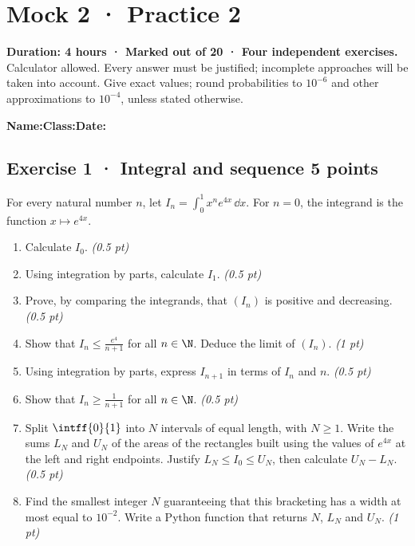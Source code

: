 \fi

\mxnewpage{}\label{sujet:8-2}

\section*{Mock 2 · Practice 2}


\textbf{Duration: 4 hours · Marked out of 20 · Four independent exercises.}\\Calculator allowed. Every answer must be justified; incomplete approaches will be taken into account. Give exact values; round probabilities to $10^{-6}$ and other approximations to $10^{-4}$, unless stated otherwise.

\smallskip\textbf{Name:}\enspace\dotfill\quad\textbf{Class:}\enspace\dotfill\quad\textbf{Date:}\enspace\dotfill

\subsection*{Exercise 1 · Integral and sequence \hfill 5 points}For every natural number $n$, let $I_n=\displaystyle\int_0^1x^ne^{4x}\,\dd x$. For $n=0$, the integrand is the function $x\mapsto e^{4x}$.

\begin{enumerate}

\item Calculate $I_0$. \hfill\textit{(0.5 pt)}

\item Using integration by parts, calculate $I_1$. \hfill\textit{(0.5 pt)}

\item Prove, by comparing the integrands, that $(I_n)$ is positive and decreasing. \hfill\textit{(0.5 pt)}

\item Show that $I_n\le\frac{e^{4}}{n+1}$ for all $n\in\N$. Deduce the limit of $(I_n)$. \hfill\textit{(1 pt)}

\item Using integration by parts, express $I_{n+1}$ in terms of $I_n$ and $n$. \hfill\textit{(0.5 pt)}

\item Show that $I_n\ge\frac1{n+1}$ for all $n\in\N$. \hfill\textit{(0.5 pt)}

\item Split $\intff{0}{1}$ into $N$ intervals of equal length, with $N\ge1$. Write the sums $L_N$ and $U_N$ of the areas of the rectangles built using the values of $e^{4x}$ at the left and right endpoints. Justify $L_N\le I_0\le U_N$, then calculate $U_N-L_N$. \hfill\textit{(0.5 pt)}

\item Find the smallest integer $N$ guaranteeing that this bracketing has a width at most equal to $10^{-2}$. Write a Python function that returns $N$, $L_N$ and $U_N$. \hfill\textit{(1 pt)}

\end{enumerate}


